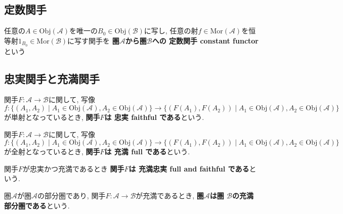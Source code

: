 \subsection{定数関手}
\begin{Def}
任意の$A\in\mathrm{Obj}(\mathscr{A})$を唯一の$B_0\in\mathrm{Obj}(\mathscr{B})$に写し,
任意の射$f\in\mathrm{Mor}(\mathscr{A})$を恒等射$1_{B_0}\in\mathrm{Mor}(\mathscr{B})$に写す関手を
{\bf 圏$\mathscr{A}$から圏$\mathscr{B}$への
定数関手 constant functor
}という
\end{Def}

\subsection{忠実関手と充満関手}
\begin{Def}
関手$F:\mathscr{A}\rightarrow\mathscr{B}$に関して,
写像
\[f:\{(A_1,A_2)\mid A_1\in\mathrm{Obj}(\mathscr{A}),A_2\in\mathrm{Obj}(\mathscr{A})\}\rightarrow\{(F(A_1),F(A_2))\mid A_1\in\mathrm{Obj}(\mathscr{A}),A_2\in\mathrm{Obj}(\mathscr{A})\}\]
が単射となっているとき,
{\bf 関手$F$は
忠実 faithful
である}という.
\end{Def}
\begin{Def}
関手$F:\mathscr{A}\rightarrow\mathscr{B}$に関して,
写像
\[f:\{(A_1,A_2)\mid A_1\in\mathrm{Obj}(\mathscr{A}),A_2\in\mathrm{Obj}(\mathscr{A})\}\rightarrow\{(F(A_1),F(A_2))\mid A_1\in\mathrm{Obj}(\mathscr{A}),A_2\in\mathrm{Obj}(\mathscr{A})\}\]
が全射となっているとき,
{\bf 関手$F$は
充満 full 
である}という.
\end{Def}

\begin{Def}
関手$F$が忠実かつ充満であるとき
{\bf 関手$F$は
充満忠実 full and faithful
である}という.
\end{Def}

\begin{Def}
圏$\mathscr{A}$が圏$\mathscr{A}$の部分圏であり, 関手$F:\mathscr{A}\rightarrow\mathscr{B}$が充満であるとき,
{\bf 圏$\mathscr{A}$は圏 $\mathscr{B}$の充満部分圏である}という.
\end{Def}

